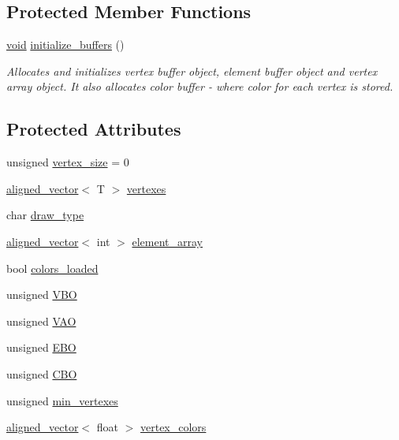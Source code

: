 \subsection*{Protected Member Functions}
\begin{DoxyCompactItemize}
\item 
\mbox{\hyperlink{glad_8h_a950fc91edb4504f62f1c577bf4727c29}{void}} \mbox{\hyperlink{classShape_a8b4f54a694871f9d131fdd105e1ca709}{initialize\+\_\+buffers}} ()
\begin{DoxyCompactList}\small\item\em Allocates and initializes vertex buffer object, element buffer object and vertex array object. It also allocates color buffer -\/ where color for each vertex is stored. \end{DoxyCompactList}\end{DoxyCompactItemize}
\subsection*{Protected Attributes}
\begin{DoxyCompactItemize}
\item 
unsigned \mbox{\hyperlink{classShape_a7cf9cc243cdd64215eca4d81704c7199}{vertex\+\_\+size}} = 0
\item 
\mbox{\hyperlink{type__definitions_8hpp_a087efd587d66b881646ef378f1919c90}{aligned\+\_\+vector}}$<$ T $>$ \mbox{\hyperlink{classShape_a50296217cf654fc7b756b67a2f0305c2}{vertexes}}
\item 
char \mbox{\hyperlink{classShape_a851fcb33238286342f670d27443ffdfc}{draw\+\_\+type}}
\item 
\mbox{\hyperlink{type__definitions_8hpp_a087efd587d66b881646ef378f1919c90}{aligned\+\_\+vector}}$<$ int $>$ \mbox{\hyperlink{classShape_accef3084e7e3897e01806b90da0a0ec8}{element\+\_\+array}}
\item 
bool \mbox{\hyperlink{classShape_a216866713d16c882a0f0b0b0a89d350d}{colors\+\_\+loaded}}
\item 
unsigned \mbox{\hyperlink{classShape_a5ca89aadcd89bb475d6ca88acf733ce6}{V\+BO}}
\item 
unsigned \mbox{\hyperlink{classShape_a30771567edd66db5d14dc630f2d63f82}{V\+AO}}
\item 
unsigned \mbox{\hyperlink{classShape_a95c775e548b129e23d2dd32e23fb0f3e}{E\+BO}}
\item 
unsigned \mbox{\hyperlink{classShape_a66502f6f87b46a705d131dc7b0b67d42}{C\+BO}}
\item 
unsigned \mbox{\hyperlink{classShape_acb30d3bdd3434dc2cb3074a4d61985ed}{min\+\_\+vertexes}}
\item 
\mbox{\hyperlink{type__definitions_8hpp_a087efd587d66b881646ef378f1919c90}{aligned\+\_\+vector}}$<$ float $>$ \mbox{\hyperlink{classShape_a1590ef02d7090f28d1ad312fd46f5030}{vertex\+\_\+colors}}
\end{DoxyCompactItemize}
